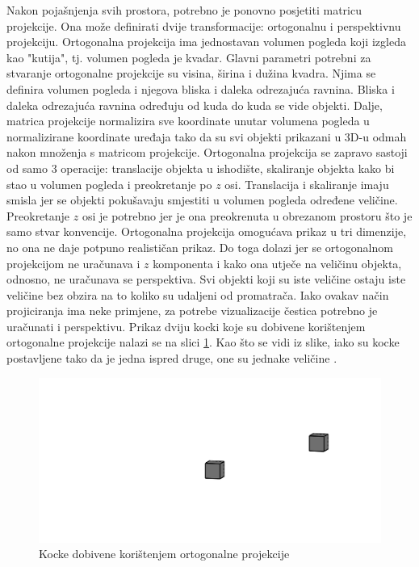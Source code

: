 \documentclass{foi}
\begin{document}
Nakon pojašnjenja svih prostora, potrebno je ponovno posjetiti matricu projekcije. Ona može definirati dvije transformacije: ortogonalnu i perspektivnu projekciju. Ortogonalna projekcija ima jednostavan volumen pogleda koji izgleda kao "kutija", tj. volumen pogleda je kvadar. Glavni parametri potrebni za stvaranje ortogonalne projekcije su visina, širina i dužina kvadra. Njima se definira volumen pogleda i njegova bliska i daleka odrezajuća ravnina. Bliska i daleka odrezajuća ravnina određuju od kuda do kuda se vide objekti. Dalje, matrica projekcije normalizira sve koordinate unutar volumena pogleda u normalizirane koordinate uređaja tako da su svi objekti prikazani u 3D-u odmah nakon množenja s matricom projekcije. Ortogonalna projekcija se zapravo sastoji od samo 3 operacije: translacije objekta u ishodište, skaliranje objekta kako bi stao u volumen pogleda i preokretanje po $z$ osi. Translacija i skaliranje imaju smisla jer se objekti pokušavaju smjestiti u volumen pogleda određene veličine. Preokretanje $z$ osi je potrebno jer je ona preokrenuta u obrezanom prostoru što je samo stvar konvencije. Ortogonalna projekcija omogućava prikaz u tri dimenzije, no ona ne daje potpuno realističan prikaz. Do toga dolazi jer se ortogonalnom projekcijom ne uračunava i $z$ komponenta i kako ona utječe na veličinu objekta, odnosno, ne uračunava se perspektiva. Svi objekti koji su iste veličine ostaju iste veličine bez obzira na to koliko su udaljeni od promatrača. Iako ovakav način projiciranja ima neke primjene, za potrebe vizualizacije čestica potrebno je uračunati i perspektivu. Prikaz dviju kocki koje su dobivene korištenjem ortogonalne projekcije nalazi se na slici \ref{fig:OrtogonalnaProjekcijaKuba}. Kao što se vidi iz slike, iako su kocke postavljene tako da je jedna ispred druge, one su jednake veličine \parencite{Orto3DBezDat}.

\begin{figure}[H]
	\centering
	\includegraphics[width=1\textwidth,trim={10cm 0cm 3cm 0cm},clip]{slike/36_OrtogonalnaProjekcijaKuba.png}
	\captionsetup{justification=centering}
	\caption{Kocke dobivene korištenjem ortogonalne projekcije}
	\label{fig:OrtogonalnaProjekcijaKuba}
\end{figure}
\end{document}
